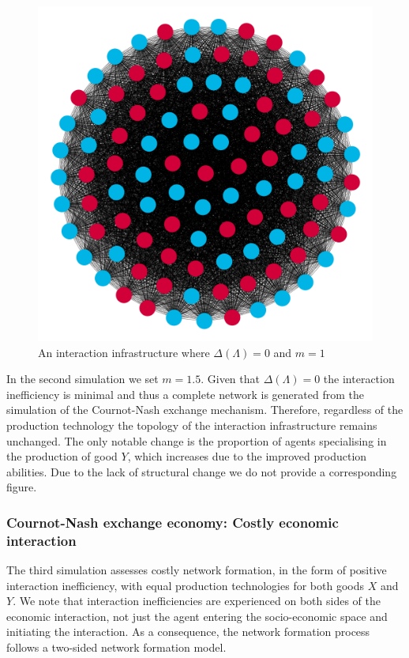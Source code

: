 \begin{figure}[t]
\centering
\includegraphics[scale=0.22]{Images/Sim1C.png}
\caption{An interaction infrastructure where $\Delta(\Lambda)=0$ and $m=1$}
\label{Sim5}
\end{figure}


In the second simulation we set $m = 1.5$. Given that $\Delta(\Lambda) = 0$ the interaction inefficiency is minimal and thus a complete network is generated from the simulation of the Cournot-Nash exchange mechanism. Therefore, regardless of the production technology the topology of the interaction infrastructure remains unchanged. The only notable change is the proportion of agents specialising in the production of good $Y$, which increases due to the improved production abilities. Due to the lack of structural change we do not provide a corresponding figure.

\subsubsection{Cournot-Nash exchange economy: Costly economic interaction}

The third simulation assesses costly network formation, in the form of positive interaction inefficiency, with equal production technologies for both goods $X$ and $Y$. We note that interaction inefficiencies are experienced on both sides of the economic interaction, not just the agent entering the socio-economic space and initiating the interaction. As a consequence, the network formation process follows a two-sided network formation model.

